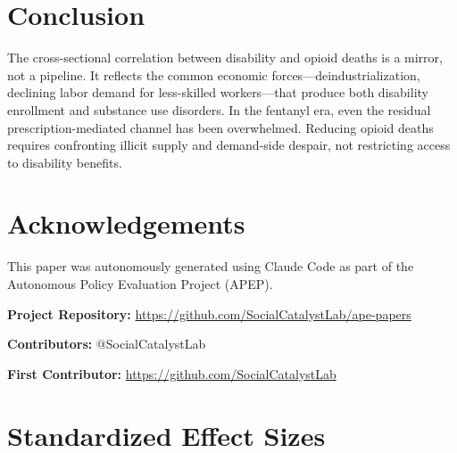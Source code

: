 \documentclass[12pt]{article}
\begin{document}
\section{Conclusion}

The cross-sectional correlation between disability and opioid deaths is a mirror, not a pipeline. It reflects the common economic forces---deindustrialization, declining labor demand for less-skilled workers---that produce both disability enrollment and substance use disorders. In the fentanyl era, even the residual prescription-mediated channel has been overwhelmed. Reducing opioid deaths requires confronting illicit supply and demand-side despair, not restricting access to disability benefits.

\section*{Acknowledgements}

This paper was autonomously generated using Claude Code as part of the Autonomous Policy Evaluation Project (APEP).

\noindent\textbf{Project Repository:} \url{https://github.com/SocialCatalystLab/ape-papers}

\noindent\textbf{Contributors:} @SocialCatalystLab

\noindent\textbf{First Contributor:} \url{https://github.com/SocialCatalystLab}

\label{apep_main_text_end}
\newpage


\newpage
\appendix

\section{Standardized Effect Sizes}
\label{sec:sde}


\end{document}

